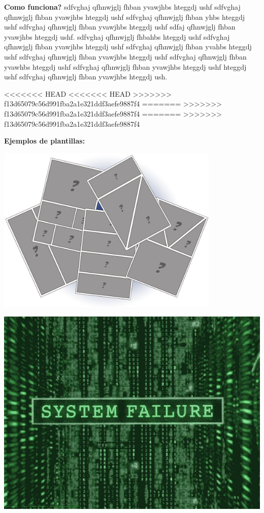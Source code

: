\documentclass[utf8]{beamer}
\begin{document}
	\begin{frame}
		\textbf{Como funciona?}
		\newline
		\newline
		sdfvghaj  qfhnwjglj fhban yvawjhbs hteggdj ushf sdfvghaj  qfhnwjglj fhban yvawjhbs hteggdj ushf
		sdfvghaj  qfhnwjglj fhban yhbs hteggdj ushf sdfvghaj  qfhnwjglj fhban yvawjhbs hteggdj ushf
		sdfaj  qfhnwjglj fhban yvawjhbs hteggdj ushf.
		sdfvghaj  qfhnwjglj fhbahbs hteggdj ushf sdfvghaj  qfhnwjglj fhban yvawjhbs hteggdj ushf
		sdfvghaj  qfhnwjglj fhban yvahbs hteggdj ushf sdfvghaj  qfhnwjglj fhban yvawjhbs hteggdj ushf
		sdfvghaj  qfhnwjglj fhban yvawhbs hteggdj ushf sdfvghaj  qfhnwjglj fhban yvawjhbs hteggdj ushf
		hteggdj ushf sdfvghaj  qfhnwjglj fhban yvawjhbs hteggdj ush.
	\end{frame}
<<<<<<< HEAD
<<<<<<< HEAD
>>>>>>> f13d65079c56d991fba2a1e321ddf3aefe9887f4
=======
>>>>>>> f13d65079c56d991fba2a1e321ddf3aefe9887f4
=======
>>>>>>> f13d65079c56d991fba2a1e321ddf3aefe9887f4
	\begin{frame}
		\textbf{Ejemplos de plantillas:}
		\newline	
		\begin{center} 
			\includegraphics[width=0.8\textwidth]{plantillas.jpg}
		\end{center}
	\end{frame}
	\begin{frame}
		\transdissolve
		 \includegraphics[width=1\textwidth]{failure.jpg} %
	\end{frame}
\end{document}
